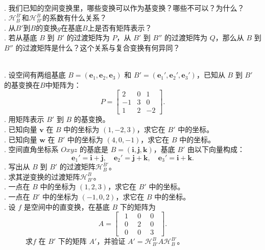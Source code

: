 \documentclass[12pt,UTF8]{ctexbook}
\begin{document}
\begin{sk}
    \mbox{} \\
    . 我们已知的空间变换里，哪些变换可以作为基变换？哪些不可以？为什么？\\
    . $\mathcal{H}_B^{B'}$和$\mathcal{H}_{B'}^B$的系数有什么关系？\\
    . 从$B'$到$B$的变换$g$在基底$B$上是否有矩阵表示？\\
    . 若从基底 $B$ 到 $B'$ 的过渡矩阵为 $P$，从 $B'$ 到 $B''$ 的过渡矩阵为 $Q$，那么从 $B$ 到 $B''$ 的过渡矩阵是什么？这个关系与复合变换有何异同？
\end{sk}

\begin{xt}
    \mbox{} \\
    . 设空间有两组基底 $B=(\mathbf{e}_1,\mathbf{e}_2,\mathbf{e}_3)$ 和 $B'=(\mathbf{e}_1',\mathbf{e}_2',\mathbf{e}_3')$，已知从 $B$ 到 $B'$ 的基变换在$B$中矩阵为：
    $$
    P = \begin{bmatrix}
    2 & 0 & 1 \\
    -1 & 3 & 0 \\
    1 & 2 & -2
    \end{bmatrix}.
    $$
    . 用矩阵表示 $B'$ 到 $B$ 的基变换。\\
    . 已知向量 $\mathbf{v}$ 在 $B$ 中的坐标为 $(1,-2,3)$，求它在 $B'$ 中的坐标。\\
    . 已知向量 $\mathbf{w}$ 在 $B'$ 中的坐标为 $(4,0,-1)$，求它在 $B$ 中的坐标。\\
    . 空间直角坐标系 $Oxyz$ 的基底是 $B=(\mathbf{i},\mathbf{j},\mathbf{k})$，基底 $B'$ 由以下向量构成：
    \[
    \mathbf{e}_1' = \mathbf{i} + \mathbf{j},\quad \mathbf{e}_2' = \mathbf{j} + \mathbf{k},\quad \mathbf{e}_3' = \mathbf{i} + \mathbf{k}.
    \]
    . 写出从 $B$ 到 $B'$ 的过渡矩阵$\mathcal{H}_B^{B'}$。\\
    . 求其逆变换的过渡矩阵$\mathcal{H}_{B'}^B$。\\
    . 一点在 $B$ 中的坐标为 $(1,2,3)$，求它在 $B'$ 中的坐标。\\
    . 一点在 $B'$ 中的坐标为 $(-1,0,2)$，求它在 $B$ 中的坐标。\\
    . 设 $f$ 是空间中的直变换，在基底 $B$ 下的矩阵为
    \[
    A = \begin{bmatrix}
    \phantom{0}1 & \phantom{0}0\phantom{0} & 0\phantom{0} \\
    \phantom{0}0 & \phantom{0}2\phantom{0} & 0\phantom{0} \\
    \phantom{0}0 & \phantom{0}0\phantom{0} & 3\phantom{0}
    \end{bmatrix}.
    \]
    \indent ~~~~~~求$f$ 在 $B'$ 下的矩阵 $A'$，并验证 $A' = \mathcal{H}_{B'}^B A \mathcal{H}_B^{B'}$。
\end{xt}
\end{document}
